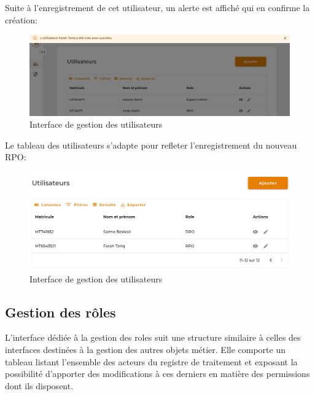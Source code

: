 \noindent Suite à l'enregistrement de cet utilisateur, un alerte est affiché qui en confirme la création: \\

\begin{figure}[H]
    \centering
    \includegraphics[width=\textwidth]{images/guis/utilisateurs/created.png}
    \caption{Interface de gestion des utilisateurs}
\end{figure}

\clearpage

\noindent Le tableau des utilisateurs s'adapte pour refleter l'enregistrement du nouveau RPO: \\

\begin{figure}[H]
    \centering
    \includegraphics[width=\textwidth]{images/guis/utilisateurs/table-post-creation.png}
    \caption{Interface de gestion des utilisateurs}
\end{figure}


\subsection{Gestion des rôles}

L'interface dédiée à la gestion des roles suit une structure similaire à celles des interfaces destinées à la gestion des autres objets métier. Elle comporte un tableau listant l'ensemble des acteurs du registre de traitement et exposant la possibilité d'apporter des modifications à ces derniers en matière des permissions dont ils disposent. \\

